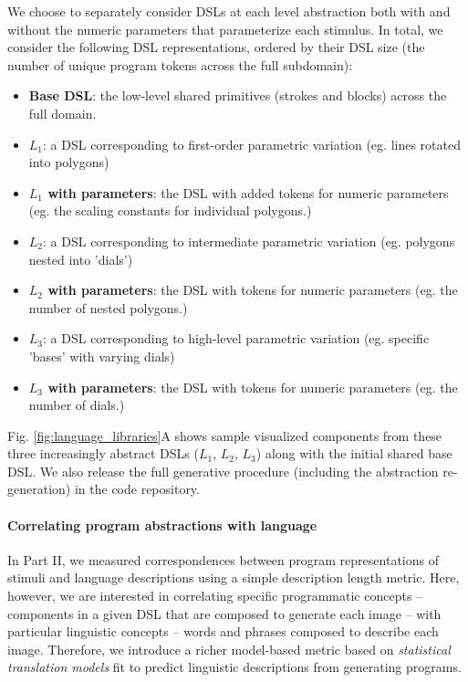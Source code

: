 \documentclass[10pt,letterpaper]{article}
\begin{document}
We choose to separately consider DSLs at each level abstraction both with and without the numeric parameters that parameterize each stimulus. In total, we consider the following DSL representations, ordered by their DSL size (the number of unique program tokens across the full subdomain):
\begin{itemize}
    \setlength\itemsep{0.1em}
    \item \textbf{Base DSL}: the low-level shared primitives (strokes and blocks) across the full domain.
    \item \textbf{$L_1$}: a  DSL corresponding to first-order parametric variation (eg. lines rotated into polygons)
    \item \textbf{$L_1$ with parameters}: the DSL with added tokens for numeric parameters (eg. the scaling constants for individual polygons.)
    
    \item \textbf{$L_2$}: a  DSL corresponding to intermediate parametric variation (eg. polygons nested into 'dials')
    \item \textbf{$L_2$ with parameters}: the DSL with tokens for numeric parameters (eg. the number of nested polygons.)
    
    \item \textbf{$L_3$}: a DSL corresponding to high-level parametric variation (eg. specific 'bases' with varying dials)
    \item \textbf{$L_3$ with parameters}: the DSL with tokens for numeric parameters (eg. the number of dials.)
\end{itemize}

Fig. \ref{fig:language_libraries}A shows sample visualized components from these three increasingly abstract DSLs ($L_1$, $L_2$, $L_3$) along with the initial shared base DSL. We also release the full generative procedure (including the abstraction re-generation) in the code repository.

\paragraph{Correlating program abstractions with language} In Part II, we measured correspondences between program representations of stimuli and language descriptions using a simple description length metric. Here, however, we are interested in correlating specific programmatic concepts  -- components in a given DSL that are composed to generate each image -- with particular linguistic concepts -- words and phrases composed to describe each image. Therefore, we introduce a richer model-based metric based on \textit{statistical translation models} fit to predict linguistic descriptions from generating programs.
\end{document}
